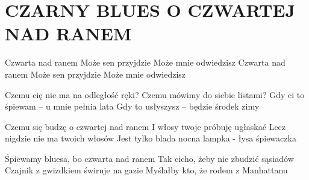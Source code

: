 \documentclass[../../../songbook.tex]{subfiles}
\begin{document}
\TabPositions{8cm} %
\section*{CZARNY BLUES O CZWARTEJ NAD RANEM}
{}
\vspace{0.5cm}
\-\hspace{1cm} Czwarta nad ranem 		 \newline
\-\hspace{1cm} Może sen przyjdzie 		 \newline
\-\hspace{1cm} Może mnie odwiedzisz 	 \newline
\-\hspace{1cm} Czwarta nad ranem 		 \newline
\-\hspace{1cm} Może sen przyjdzie 		 \newline
\-\hspace{1cm} Może mnie odwiedzisz 	 \newline

Czemu cię nie ma na odległość ręki? 	 \newline
Czemu mówimy do siebie listami? 		 \newline
Gdy ci to śpiewam – u mnie pełnia lata	 \newline
Gdy to usłyszysz – będzie środek zimy	 \newline

Czemu się budzę o czwartej nad ranem 			\newline
I włosy twoje próbuję ugłaskać 			\newline
Lecz nigdzie nie ma twoich włosów 			\newline
Jest tylko blada nocna lampka - łysa śpiewaczka 			\newline

Śpiewamy bluesa, bo czwarta nad ranem 			\newline
Tak cicho, żeby nie zbudzić sąsiadów 			\newline
Czajnik z gwizdkiem świruje na gazie 			\newline
Myślałby kto, że rodem z Manhattanu 			\newline
\end{document}
